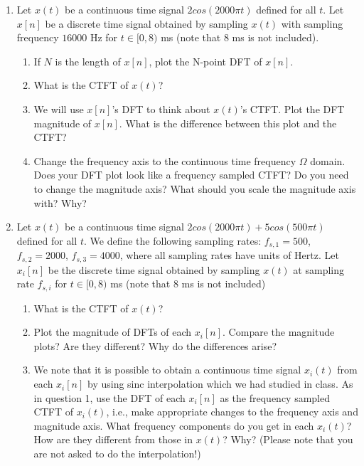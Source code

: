 \myhrule
\begin{enumerate}
\item Let $x(t)$ be a continuous time signal $2cos(2000\pi t)$ defined for all $t$. Let $x[n]$ be a discrete time signal obtained by sampling $x(t)$ with sampling frequency $16000$ Hz for $t \in [0, 8)$ ms (note that $8$ ms is not included).
  \begin{enumerate}
  \item If $N$ is the length of $x[n]$, plot the N-point DFT of $x[n]$.
  \item What is the CTFT of $x(t)$?
  \item We will use $x[n]$'s DFT to think about $x(t)$'s CTFT. Plot the DFT magnitude of $x[n]$. What is the difference between this plot and the CTFT?
  \item Change the frequency axis to the continuous time frequency $\Omega$ domain. Does your DFT plot look like a frequency sampled CTFT? Do you need to change the magnitude axis? What should you scale the magnitude axis with? Why?
  \end{enumerate}
  
\item Let $x(t)$ be a continuous time signal $2cos(2000\pi t) + 5cos(500\pi t)$ defined for all $t$. We define the following sampling rates: $f_{s,1} = 500$, $f_{s,2} = 2000$, $f_{s,3} = 4000$, where all sampling rates have units of Hertz. Let $x_{i}[n]$ be the discrete time signal obtained by sampling $x(t)$ at sampling rate $f_{s, i}$ for $t \in [0, 8)$ ms (note that $8$ ms is not included)
  \begin{enumerate}
  \item What is the CTFT of $x(t)$?
  \item Plot the magnitude of DFTs of each $x_{i}[n]$. Compare the magnitude plots? Are they different? Why do the differences arise?
  \item We note that it is possible to obtain a continuous time signal $x_{i}(t)$ from each $x_{i}[n]$ by using sinc interpolation which we had studied in class. As in question 1, use the DFT of each $x_{i}[n]$ as the frequency sampled CTFT of $x_{i}(t)$, i.e., make appropriate changes to the frequency axis and magnitude axis. What frequency components do you get in each $x_{i}(t)$? How are they different from those in $x(t)$? Why? (Please note that you are not asked to do the interpolation!)
  \end{enumerate}


\end{enumerate}

